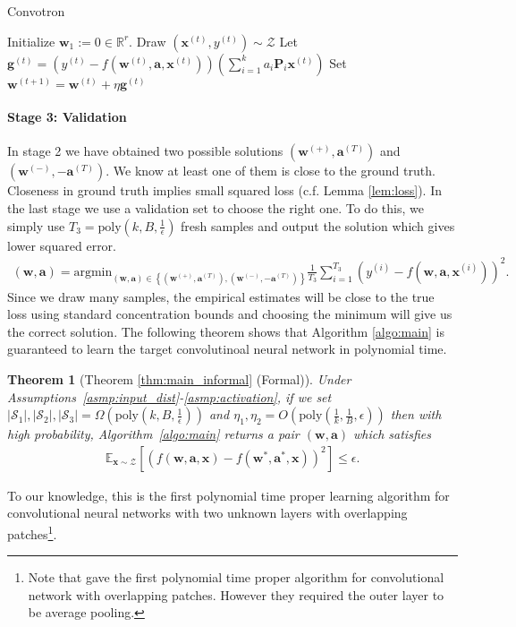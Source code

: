 \documentclass[11pt]{article}
\newcommand{\argmin}{\mathrm{argmin}}
\newcommand{\poly}{\mathrm{poly}}
\newcommand{\mat}[1]{\mathbf{#1}}
\newcommand{\vect}[1]{\mathbf{#1}}
\newcommand{\abs}[1]{\left|#1\right|}
\newcommand{\expect}{\mathbb{E}}
\newcommand{\inputdist}{\mathcal{Z}}
\newtheorem{thm}{Theorem}[section]
\begin{document}
\begin{algorithm}[t]
   \caption{Convotron \citep{goel2018learning}}
   \label{alg:convotron}
\begin{algorithmic}
   \State Initialize $\vect{w}_1 := 0 \in \mathbb{R}^r$.
   \State Draw $(\vect{x}^{(t)}, y^{(t)}) \sim \inputdist$
   \State Let $\vect{g}^{(t)} = (y^{(t)} - f(\vect{w}^{(t)}, \vect{a}, \vect{x}^{(t)}))  \left(\sum_{i=1}^k a_i \mat{P}_i  \vect{x}^{(t)}\right)$
   \State Set $\vect{w}^{(t+1)} = \vect{w}^{(t)} + \eta \vect{g}^{(t)}$
   \EndFor
   \State{Return $\vect{w}_{T+1}$}
\end{algorithmic}
\end{algorithm}\paragraph{Stage 3: Validation}
In stage 2 we have obtained two possible solutions $\left(\vect{w}^{(+)},\vect{a}^{(T)}\right)$ and $\left(\vect{w}^{(-)},-\vect{a}^{(T)}\right)$.
We know at least one of them is close to the ground truth. Closeness in ground truth implies small squared loss (c.f. Lemma \ref{lem:loss}). 
In the last stage we use a validation set to choose the right one.
To do this, we simply use $T_3 = \poly\left(k,B,\frac{1}{\epsilon}\right)$ fresh samples and output the solution which gives lower squared error. 
\begin{align}
\left(\vect{w},\vect{a}\right) = \argmin_{\left(\vect{w},\vect{a}\right) \in \left\{\left(\vect{w}^{(+)},\vect{a}^{(T)}\right), \left(\vect{w}^{(-)},-\vect{a}^{(T)}\right)\right\}} \frac{1}{T_3}\sum_{i=1}^{T_3}\left(y^{(i)} - f\left(\vect{w},\vect{a},\vect{x}^{(i)}\right) \right)^2.\label{eqn:hypo_testing}
\end{align}
Since we draw many samples, the empirical estimates will be close to the true loss using standard concentration bounds and choosing the minimum will give us the correct solution.
The following theorem shows that Algorithm \ref{algo:main} is guaranteed to learn the target convolutinoal neural network in polynomial time.
\begin{thm}[Theorem \ref{thm:main_informal} (Formal)]
  \label{thm:main}{}
Under Assumptions~\ref{asmp:input_dist}-\ref{asmp:activation}, if we set $\abs{\mathcal{S}_1},\abs{\mathcal{S}_2},\abs{\mathcal{S}_3} = \Omega\left(\poly\left(k,B,\frac{1}{\epsilon}\right)\right)$ and $\eta_1, \eta_2 = O\left(\poly\left(\frac{1}{k},\frac{1}{B},\epsilon\right)\right)$ then with high probability, Algorithm~\ref{algo:main} returns a pair $\left(\vect{w},\vect{a}\right)$ which satisfies\begin{align*}
  \expect_{\vect{x} \sim \inputdist}\left[ \left(f(\vect{w},\vect{a},\vect{x})-f(\vect{w}^*,\vect{a}^*,\vect{x})\right)^2\right] \le \epsilon.
\end{align*}
\end{thm}
To our knowledge, this is the first polynomial time proper learning algorithm for convolutional neural networks with two unknown layers with overlapping patches\footnote{Note that \citet{goel2018learning} gave the first polynomial time proper algorithm for convolutional network with overlapping patches. 
However they required the outer layer to be average pooling.}.
\end{document}
